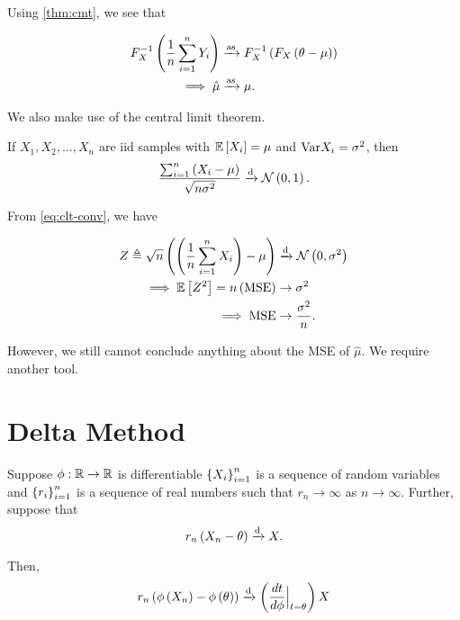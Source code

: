 \documentclass[twoside]{article}
\begin{document}
Using \autoref{thm:cmt}, we see that

\begin{align}
    F_X^{-1}\left(\frac{1}{n}\sum_{i=1}^nY_i\right) &\xrightarrow{\mathrm{as}} F_X^{-1}\left(F_X\left(\theta-\mu\right)\right) \\
    \implies \hat{\mu} &\xrightarrow{\mathrm{as}} \mu.
    \label{eq:dme-loc-mu}
\end{align}

We also make use of the central limit theorem.

\begin{theorem}
    \label{thm:clt}
    If \(X_1,X_2,\ldots,X_n\) are iid samples with \(\mathbb{E}\left[ X_i \right] = \mu\) and
    \(\mathrm{Var}{X_i} = \sigma^2\), then
    \begin{equation}
        \frac{\sum_{i=1}^n\left(X_i-\mu\right)}{\sqrt{n\sigma^2}} \xrightarrow{\mathrm{d}} \mathcal N\left(0,1\right).
        \label{eq:clt-conv}
    \end{equation}
\end{theorem}

From \eqref{eq:clt-conv}, we have

\begin{align}
    Z \triangleq \sqrt{n}\left(\left(\frac{1}{n}\sum_{i=1}^nX_i\right)-\mu\right) &\xrightarrow{\mathrm{d}} \mathcal N\left(0,\sigma^2\right) \\
    \implies \mathbb{E}\left[ Z^2 \right] = n\left(\mathrm{MSE}\right) &\to \sigma^2 \\
    \implies \mathrm{MSE} &\to \frac{\sigma^2}{n}.
    \label{eq:mse-n-inv}
\end{align}

However, we still cannot conclude anything about the MSE of \(\hat{\mu}\). We 
require another tool.

\section{Delta Method}

Suppose \(\phi:\mathbb R\rightarrow\mathbb R\) is differentiable \(\left\{X_i\right\}_{i=1}^n\)
is a sequence of random variables and \(\left\{r_i\right\}_{i=1}^n\) is a sequence
of real numbers such that \(r_n\to\infty\) as \(n\to\infty\). Further, suppose
that
\begin{equation}
    r_n\left(X_n-\theta\right) \xrightarrow{\mathrm{d}} X.
    \label{eq:rn-Xn-cond}
\end{equation}

Then,
\begin{equation}
    r_n\left(\phi\left(X_n\right)-\phi\left(\theta\right)\right) \xrightarrow{\mathrm{d}} \left(\frac{dt}{d\phi}\Big|_{t=\theta}\right)X
\end{equation}
\end{document}
